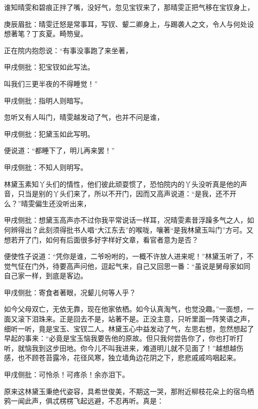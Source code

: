 \begin{parag}


    谁知晴雯和碧痕正拌了嘴，没好气，忽见宝钗来了，那晴雯正把气移在宝钗身上，\begin{note}庚辰眉批：晴雯迁怒是常事耳，写钗、颦二卿身上，与踢袭人之文，令人与何处设想著笔？丁亥夏。畸笏叟。\end{note}正在院内抱怨说：“有事没事跑了来坐著，\begin{note}甲戌侧批：犯宝钗如此写法。\end{note}叫我们三更半夜的不得睡觉！”\begin{note}甲戌侧批：指明人则暗写。\end{note}忽听又有人叫门，晴雯越发动了气，也并不问是谁，\begin{note}甲戌侧批：犯黛玉如此写明。\end{note}便说道：“都睡下了，明儿再来罢！”\begin{note}甲戌侧批：不知人则明写。\end{note}林黛玉素知丫头们的情性，他们彼此顽耍惯了，恐怕院内的丫头没听真是他的声音，只当是别的丫头们来了，所以不开门，因而又高声说道：“是我，还不开么？”晴雯偏生还没听出来，\begin{note}甲戌侧批：想黛玉高声亦不过你我平常说话一样耳，况晴雯素昔浮躁多气之人，如何辨得出？此刻须得批书人唱“大江东去”的喉咙，嚷著“是我林黛玉叫门”方可。又想若开了门，如何有后面很多好字样好文章，看官者意为是否？\end{note}便使性子说道：“凭你是谁，二爷吩咐的，一概不许放人进来呢！”林黛玉听了，不觉气怔在门外，待要高声问他，逗起气来，自己又回思一番：“虽说是舅母家如同自己家一样，到底是客边。\begin{note}甲戌侧批：寄食者著眼，况颦儿何等人乎？\end{note}如今父母双亡，无依无靠，现在他家依栖。如今认真淘气，也觉没趣。”一面想，一面又滚下泪珠来。正是回去不是，站著不是。正没主意，只听里面一阵笑语之声，细听一听，竟是宝玉、宝钗二人。林黛玉心中益发动了气，左思右想，忽然想起了早起的事来：“必竟是宝玉恼我要告他的原故。但只我何尝告你了，你也打听打听，就恼我到这步田地。你今儿不叫我进来，难道明儿就不见面了！”越想越伤感，也不顾苍苔露冷，花径风寒，独立墙角边花阴之下，悲悲戚戚呜咽起来。\begin{note}甲戌侧批：可怜杀！可疼杀！余亦泪下。\end{note}
\end{parag}


\begin{parag}


    原来这林黛玉秉绝代姿容，具希世俊美，不期这一哭，那附近柳枝花朵上的宿鸟栖鸦一闻此声，俱忒楞楞飞起远避，不忍再听。真是：
\end{parag}

